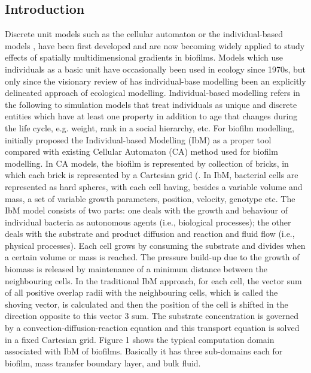 \documentclass[11pt,a4paper,openright]{article}
\begin{document}
\subsection{Introduction}
Discrete unit models such as the cellular automaton \citep{picioreanu1998mathematical} or the individual-based models \citep{kreft1998bacsim}, have been first developed and are now becoming widely applied to study effects of spatially multidimensional gradients in biofilms. Models which use individuals as a basic unit have occasionally been used in ecology since 1970s, but only since the visionary review of \citet{huston1988new} has individual-base modelling been an explicitly delineated approach of ecological modelling. Individual-based modelling refers in the following to simulation models that treat individuals as unique and discrete entities which have at least one property in addition to age that changes during the life cycle, e.g. weight, rank in a social hierarchy, etc. For biofilm modelling, \citet{kreft2001individual,picioreanu1998mathematical} initially proposed the Individual-based Modelling (IbM) as a proper tool compared with existing Cellular Automaton (CA) method used for biofilm modelling. In CA models, the biofilm is represented by collection of bricks, in which each brick is represented by a Cartesian grid (\citep{picioreanu1998mathematical,picioreanu1998new,picioreanu2000theoretical,eberl2000three}. In IbM, bacterial cells are represented as hard spheres, with each cell having, besides a variable volume and mass, a set of variable growth parameters, position, velocity, genotype etc. The IbM model consists of two parts: one deals with the growth and behaviour of individual bacteria as autonomous agents (i.e., biological processes); the other deals with the substrate and product diffusion and reaction and fluid flow (i.e., physical processes). Each cell grows by consuming the substrate and divides when a certain volume or mass is reached. The pressure build-up due to the growth of biomass is released by maintenance of a minimum distance between the neighbouring cells. In the traditional IbM approach, for each cell, the vector sum of all positive overlap radii with the neighbouring cells, which is called the shoving vector, is calculated and then the position of the cell is shifted in the direction opposite to this vector 3 sum. The substrate concentration is governed by a convection-diffusion-reaction equation and this transport equation is solved in a fixed Cartesian grid. Figure 1 shows the typical computation domain associated with IbM of biofilms. Basically it has three sub-domains each for biofilm, mass transfer boundary layer, and bulk fluid.
\end{document}
